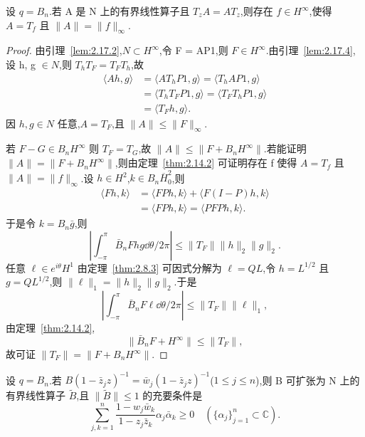 \begin{theorem}[Sarason]\label{thm:2.17.5}
设 $q = B_{n}$.若 A 是 N 上的有界线性算子且 $T_{z}A = AT_{z}$,则存在 $f \in H^{\infty}$,使得 $A = T_{f}$ 且 $\|A\| = \|f\|_{\infty}$.
\end{theorem}

\begin{proof}
由引理~\ref{lem:2.17.2},$N \subset H^{\infty}$,令 F = AP1,则 $F \in H^{\infty}$.由引理~\ref{lem:2.17.4},设 h, g $\in N$,则 $T_{h}T_{F} = T_{F}T_{h}$,故
\begin{align*}
\langle Ah, g \rangle & = \langle AT_{h}P1, g \rangle = \langle T_{h}AP1, g \rangle \\
& = \langle T_{h}T_{F}P1, g \rangle = \langle T_{F}T_{h}P1, g \rangle \\
& = \langle T_{F}h, g \rangle .
\end{align*}
因 $h, g \in N$ 任意,$A = T_{F}$,且 $\|A\| \leq \|F\|_{\infty}$.

若 $F - G \in B_{n}H^{\infty}$ 则 $T_{F} = T_{G}$,故 $\|A\| \leq \|F + B_{n}H^{\infty}\|$.若能证明 $\|A\| = \|F + B_{n}H^{\infty}\|$,则由定理~\ref{thm:2.14.2} 可证明存在 f 使得 $A = T_{f}$ 且 $\|A\| = \|f\|_{\infty}$.设 $h \in H^{2}$,$k \in B_{n}\overline{H}_{0}^{2}$,则
\begin{align*}
\langle Fh, k \rangle & = \langle FPh, k \rangle + \langle F(I - P)h, k \rangle \\
& = \langle FPh, k \rangle = \langle PFPh, k \rangle .
\end{align*}
于是令 $k = B_{n}\bar{g}$,则
\begin{equation*}
\left| \int_{-\pi}^{\pi} \bar{B}_{n}Fhg \dd \theta / 2\pi \right| \leq \|T_{F}\|\|h\|_{2}\|g\|_{2}.
\end{equation*}
任意 $\ell \in e^{i\theta}H^{1}$ 由定理~\ref{thm:2.8.3} 可因式分解为 $\ell = QL$,令 $h = L^{1/2}$ 且 $g = QL^{1/2}$,则 $\|\ell\|_{1} = \|h\|_{2}\|g\|_{2}$.于是
\begin{equation*}
\left| \int_{-\pi}^{\pi} \bar{B}_{n}F\ell \dd \theta / 2\pi \right| \leq \|T_{F}\|\|\ell\|_{1},
\end{equation*}
由定理~\ref{thm:2.14.2},
\begin{equation*}
\|\bar{B}_{n}F + H^{\infty}\| \leq \|T_{F}\|,
\end{equation*}
故可证 $\|T_{F}\| = \|F + B_{n}H^{\infty}\|$.
\end{proof}

\begin{lemma}\label{lem:2.17.6}
设 $q = B_{n}$.若 $B(1 - \bar{z}_{j}z)^{-1} = \bar{w}_{j}(1 - \bar{z}_{j}z)^{-1}$($1 \leq j \leq n$),则 B 可扩张为 N 上的有界线性算子 $\tilde{B}$,且 $\|\tilde{B}\| \leq 1$ 的充要条件是
\begin{equation*}
\sum_{j,k=1}^{n} \frac{1 - w_{j}\bar{w}_{k}}{1 - z_{j}\bar{z}_{k}} \alpha_{j}\bar{\alpha}_{k} \geq 0 \quad (\{\alpha_{j}\}_{j=1}^{n} \subset \mathbb{C}).
\end{equation*}
\end{lemma}

